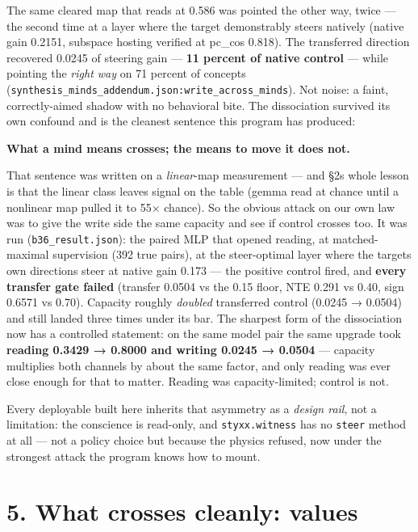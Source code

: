\documentclass[11pt]{article}
\begin{document}
The same cleared map that reads at 0.586 was pointed the other way, twice --- the second time at a layer where the target demonstrably steers natively (native gain 0.2151, subspace hosting verified at pc\_cos 0.818). The transferred direction recovered 0.0245 of steering gain --- \textbf{11 percent of native control} --- while pointing the \emph{right way} on 71 percent of concepts (\texttt{synthesis\_minds\_addendum.json:write\_across\_minds}). Not noise: a faint, correctly-aimed shadow with no behavioral bite. The dissociation survived its own confound and is the cleanest sentence this program has produced:

\textbf{What a mind means crosses; the means to move it does not.}

That sentence was written on a \emph{linear}-map measurement --- and §2\textquotesingle s whole lesson is that the linear class leaves signal on the table (gemma read at chance until a nonlinear map pulled it to 55× chance). So the obvious attack on our own law was to give the write side the same capacity and see if control crosses too. It was run (\texttt{b36\_result.json}): the paired MLP that opened reading, at matched-maximal supervision (392 true pairs), at the steer-optimal layer where the target\textquotesingle s own directions steer at native gain 0.173 --- the positive control fired, and \textbf{every transfer gate failed} (transfer 0.0504 vs the 0.15 floor, NTE 0.291 vs 0.40, sign 0.6571 vs 0.70). Capacity roughly \emph{doubled} transferred control (0.0245 → 0.0504) and still landed three times under its bar. The sharpest form of the dissociation now has a controlled statement: on the same model pair the same upgrade took \textbf{reading 0.3429 → 0.8000 and writing 0.0245 → 0.0504} --- capacity multiplies both channels by about the same factor, and only reading was ever close enough for that to matter. Reading was capacity-limited; control is not.

Every deployable built here inherits that asymmetry as a \emph{design rail}, not a limitation: the conscience is read-only, and \texttt{styxx.witness} has no \texttt{steer} method at all --- not a policy choice but because the physics refused, now under the strongest attack the program knows how to mount.

\section{5. What crosses cleanly: values}\label{5-what-crosses-cleanly-values}
\end{document}
